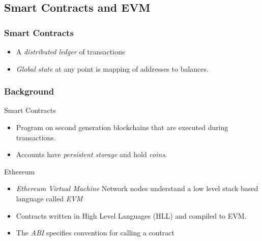\documentclass{beamer}
\begin{document}
\subsection{Smart Contracts and EVM}
\begin{frame}[fragile]
    \frametitle{Smart Contracts}
  \begin{figure}
    \centering
    \begin{tikzpicture}[shorten >=1pt,on grid, node distance=2.3cm, draw=black!80, auto]
      
    \end{tikzpicture}
  \end{figure}
  \begin{itemize}
    \item A \textit{distributed ledger} of transactions
    \item \textit{Global state} at any point is mapping of addresses to
      balances.
  \end{itemize}
\end{frame}
\begin{frame}
  \frametitle{Background}
  \begin{block}{Smart Contracts}
    \begin{itemize}
      \item Program on second generation blockchains that are executed
        during transactions.
      \item Accounts have \textit{persistent storage} and hold \textit{coins}.
    \end{itemize}
  \end{block}
  \pause
  \begin{block}{Ethereum}
    \begin{itemize}
      \item \textit{Ethereum Virtual Machine} Network nodes
        understand a low level stack based language called \textit{EVM}
      \item Contracts written in High Level Languages (HLL) and compiled to EVM.
      \item The \textit{ABI} specifies convention for calling a contract
    \end{itemize}
  \end{block}
\end{frame}
\end{document}
